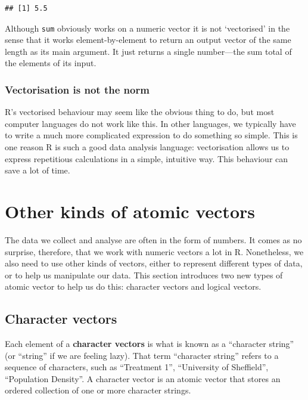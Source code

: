 \documentclass[
]{book}
\newenvironment{greybox}{
  \definecolor{shadecolor}{rgb}{0.95,0.95,0.95}  %
  \color{black}
  \begin{shaded}}
 {\end{shaded}}
\newenvironment{infobox}[1]
  {
  \begin{itemize}
  \renewcommand{\labelitemi}{
    \raisebox{-.7\height}[0pt][0pt]{
      {\setkeys{Gin}{width=3em,keepaspectratio}
        \texttt{[image: images/\#1]}}
    }
  }
  \setlength{\fboxsep}{1em}
  \begin{greybox}
  \item
  }
  {
  \end{greybox}
  \end{itemize}
  }
\begin{document}
\begin{verbatim}
## [1] 5.5
\end{verbatim}

Although \texttt{sum} obviously works on a numeric vector it is not `vectorised' in the sense that it works element-by-element to return an output vector of the same length as its main argument. It just returns a single number---the sum total of the elements of its input.

\begin{infobox}{information}

\hypertarget{vectorisation-is-not-the-norm}{%
\subsubsection*{Vectorisation is not the norm}\label{vectorisation-is-not-the-norm}}

R's vectorised behaviour may seem like the obvious thing to do, but most computer languages do not work like this. In other languages, we typically have to write a much more complicated expression to do something so simple. This is one reason R is such a good data analysis language: vectorisation allows us to express repetitious calculations in a simple, intuitive way. This behaviour can save a lot of time.

\end{infobox}

\hypertarget{other-vectors}{%
\section{Other kinds of atomic vectors}\label{other-vectors}}

The data we collect and analyse are often in the form of numbers. It comes as no surprise, therefore, that we work with numeric vectors a lot in R. Nonetheless, we also need to use other kinds of vectors, either to represent different types of data, or to help us manipulate our data. This section introduces two new types of atomic vector to help us do this: character vectors and logical vectors.

\hypertarget{character-vectors}{%
\subsection{Character vectors}\label{character-vectors}}

Each element of a \textbf{character vectors} is what is known as a ``character string'' (or ``string'' if we are feeling lazy). That term ``character string'' refers to a sequence of characters, such as ``Treatment 1'', ``University of Sheffield'', ``Population Density''. A character vector is an atomic vector that stores an ordered collection of one or more character strings.
\end{document}
